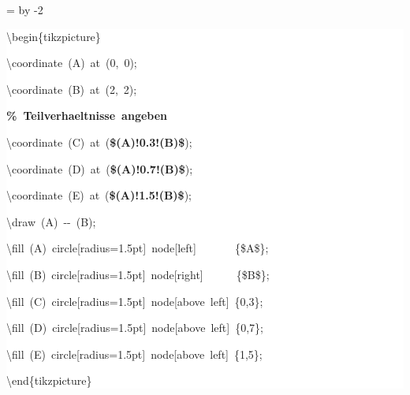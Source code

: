 \begingroup
\ttfamily
{}
=\textwidth
\advance{} by -2\fboxsep
\noindent
\colorbox{background}
{%
\parbox{\dimen255}
{%
\rule[-0.5ex]{0pt}{2.5ex}\hspace*{0.0em}\textbackslash{}begin\{tikzpicture\}\\
\rule[-0.5ex]{0pt}{2.5ex}\hspace*{1.0em}\textbackslash{}coordinate~(A)~at~(0,~0);\\
\rule[-0.5ex]{0pt}{2.5ex}\hspace*{1.0em}\textbackslash{}coordinate~(B)~at~(2,~2);\\
\rule[-0.5ex]{0pt}{2.5ex}\hspace*{1.0em}\textcolor{G}{\textbf{\%~Teilverhaeltnisse~angeben}}\\
\rule[-0.5ex]{0pt}{2.5ex}\hspace*{1.0em}\textbackslash{}coordinate~(C)~at~(\textcolor{R}{\textbf{\$(A)!0.3!(B)\$}});\\
\rule[-0.5ex]{0pt}{2.5ex}\hspace*{1.0em}\textbackslash{}coordinate~(D)~at~(\textcolor{R}{\textbf{\$(A)!0.7!(B)\$}});\\
\rule[-0.5ex]{0pt}{2.5ex}\hspace*{1.0em}\textbackslash{}coordinate~(E)~at~(\textcolor{R}{\textbf{\$(A)!1.5!(B)\$}});\\
\rule[-0.5ex]{0pt}{2.5ex}\hspace*{1.0em}\textbackslash{}draw~(A)~{-}{-}~(B);\\
\rule[-0.5ex]{0pt}{2.5ex}\hspace*{1.0em}\textbackslash{}fill~(A)~circle[radius=1.5pt]~node[left]~~~~~~~\{\$A\$\};\\
\rule[-0.5ex]{0pt}{2.5ex}\hspace*{1.0em}\textbackslash{}fill~(B)~circle[radius=1.5pt]~node[right]~~~~~~\{\$B\$\};\\
\rule[-0.5ex]{0pt}{2.5ex}\hspace*{1.0em}\textbackslash{}fill~(C)~circle[radius=1.5pt]~node[above~left]~\{0,3\};\\
\rule[-0.5ex]{0pt}{2.5ex}\hspace*{1.0em}\textbackslash{}fill~(D)~circle[radius=1.5pt]~node[above~left]~\{0,7\};\\
\rule[-0.5ex]{0pt}{2.5ex}\hspace*{1.0em}\textbackslash{}fill~(E)~circle[radius=1.5pt]~node[above~left]~\{1,5\};\\
\rule[-0.5ex]{0pt}{2.5ex}\hspace*{0.0em}\textbackslash{}end\{tikzpicture\}}%
}%
\endgroup
